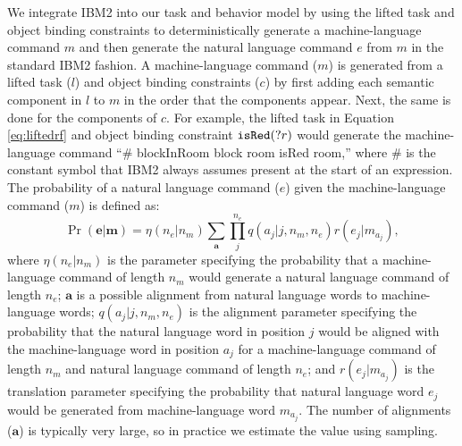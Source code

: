 \documentclass[conference]{IEEEtran}
\begin{document}
We integrate IBM2 into our task and behavior model by using the lifted task and object binding constraints to deterministically generate a machine-language command $m$ and then generate the natural language command $e$ from $m$ in the standard IBM2 fashion. 
A machine-language command ($m$) is generated from a lifted task ($l$) and object binding constraints ($c$) by first adding each semantic component in $l$
to $m$ in the order that the components appear. Next, the same is done for the components of $c$. For example, the lifted task in Equation \ref{eq:liftedrf} and object binding constraint ${\tt isRed}(?r)$ would generate the machine-language command ``\# blockInRoom block room isRed room,'' where \# is the constant symbol that IBM2 always assumes present at the start of an expression. The probability of a natural language command ($e$) given the machine-language command ($m$) is defined as:
{\small
\begin{equation}
\Pr({\mathbf e} | {\mathbf m}) = \eta(n_e | n_m) \sum_{\mathbf a} \prod_j^{n_e} q(a_j | j, n_m, n_e) r(e_j | m_{a_j}),
\end{equation}
}
where $\eta(n_e | n_m)$ is the parameter specifying the probability that a machine-language command of length $n_m$%
would generate a natural language command of length $n_e$; %
${\mathbf a}$ is a possible alignment from natural language words to machine-language words; $q(a_j | j, n_m, n_e)$ is the alignment parameter specifying the probability that the natural language word in position $j$ would be aligned with the machine-language word in position $a_j$ for a machine-language command of length $n_m$ and natural language command of length $n_e$;  and $r(e_j | m_{a_j})$ is the translation parameter specifying the probability that natural language word $e_j$ would be generated from machine-language word $m_{a_j}$. The number of alignments (${\mathbf a}$) is typically very large, so in practice we estimate the value using sampling. 
 
\end{document}
